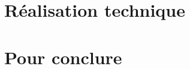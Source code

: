 

\chapter{Réalisation technique}



%


\chapter{Pour conclure}





\appendices
\renewcommand{\thecontentspage}{Annexe}





